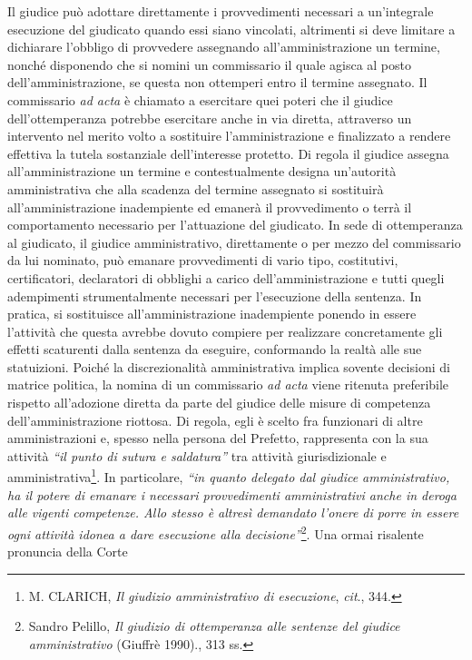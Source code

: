\documentclass[12pt,it,a4paper,]{report}
\begin{document}
Il giudice può adottare direttamente i provvedimenti necessari a
un'integrale esecuzione del giudicato quando essi siano vincolati,
altrimenti si deve limitare a dichiarare l'obbligo di provvedere
assegnando all'amministrazione un termine, nonché disponendo che si
nomini un commissario il quale agisca al posto dell'amministrazione, se
questa non ottemperi entro il termine assegnato. Il commissario \emph{ad
acta} è chiamato a esercitare quei poteri che il giudice
dell'ottemperanza potrebbe esercitare anche in via diretta, attraverso
un intervento nel merito volto a sostituire l'amministrazione e
finalizzato a rendere effettiva la tutela sostanziale dell'interesse
protetto. Di regola il giudice assegna all'amministrazione un termine e
contestualmente designa un'autorità amministrativa che alla scadenza del
termine assegnato si sostituirà all'amministrazione inadempiente ed
emanerà il provvedimento o terrà il comportamento necessario per
l'attuazione del giudicato. In sede di ottemperanza al giudicato, il
giudice amministrativo, direttamente o per mezzo del commissario da lui
nominato, può emanare provvedimenti di vario tipo, costitutivi,
certificatori, declaratori di obblighi a carico dell'amministrazione e
tutti quegli adempimenti strumentalmente necessari per l'esecuzione
della sentenza. In pratica, si sostituisce all'amministrazione
inadempiente ponendo in essere l'attività che questa avrebbe dovuto
compiere per realizzare concretamente gli effetti scaturenti dalla
sentenza da eseguire, conformando la realtà alle sue statuizioni. Poiché
la discrezionalità amministrativa implica sovente decisioni di matrice
politica, la nomina di un commissario \emph{ad acta} viene ritenuta
preferibile rispetto all'adozione diretta da parte del giudice delle
misure di competenza dell'amministrazione riottosa. Di regola, egli è
scelto fra funzionari di altre amministrazioni e, spesso nella persona
del Prefetto, rappresenta con la sua attività \emph{``il punto di sutura
e saldatura''} tra attività giurisdizionale e amministrativa\footnote{M.
  CLARICH, \emph{Il giudizio amministrativo di esecuzione}, \emph{cit}.,
  344.}. In particolare, \emph{``in quanto delegato dal giudice
amministrativo, ha il potere di emanare i necessari provvedimenti
amministrativi anche in deroga alle vigenti competenze. Allo stesso è
altresì demandato l'onere di porre in essere ogni attività idonea a dare
esecuzione alla decisione''}\footnote{{Sandro Pelillo, \emph{Il giudizio
  di ottemperanza alle sentenze del giudice amministrativo} ({Giuffrè}
  1990).}, 313 ss.}. Una ormai risalente pronuncia della Corte
\end{document}
